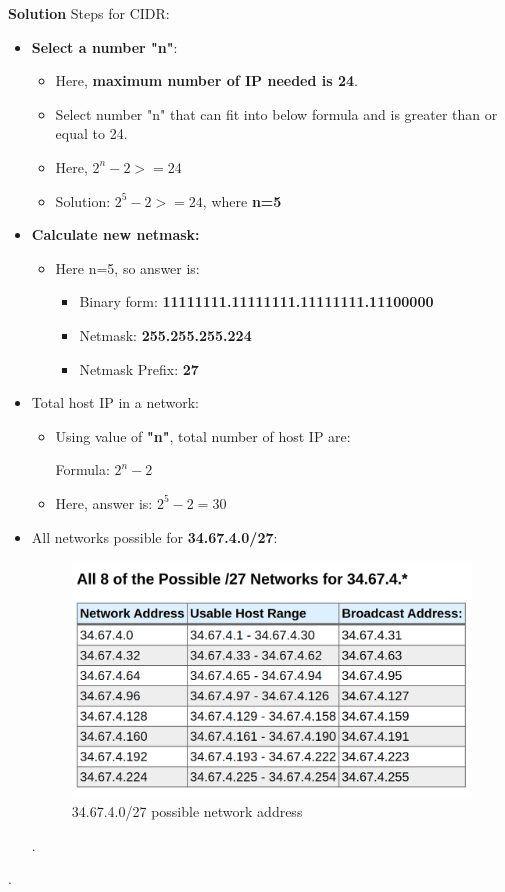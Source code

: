 \begin{flushleft}
\newpage
	\textbf{Solution}
\newline
Steps for CIDR:
\begin{itemize}
	
	\item \textbf{Select a number "n"}:
	\begin{itemize}
		\item Here, \textbf{maximum number of IP needed is 24}.
		\item Select number "n" that can fit into below formula and is greater than or equal to 24.
		\item Here, $2^n-2 >= 24$
		\item Solution: $2^5-2 >= 24$, where \textbf{n=5}
	\end{itemize}
	\item \textbf{Calculate new netmask:}
	\begin{itemize}
		\item Here n=5, so answer is:
		\begin{itemize}
			\item Binary form: \textbf{11111111.11111111.11111111.11100000}
			\item Netmask: \textbf{255.255.255.224}
			\item Netmask Prefix: \textbf{27}
		\end{itemize}
	\end{itemize}
	\item Total host IP in a network:
	\begin{itemize}
		\item Using value of \textbf{"n"}, total number of host IP are:
		\begin{tcolorbox}[breakable,notitle,boxrule=-0pt,colback=pink,colframe=pink]
			\color{black}
			Formula: $2^n-2$
			\font=4pt
		\end{tcolorbox}
		\item Here, answer is: $2^5-2=30$
	\end{itemize}
	\item All networks possible for \textbf{34.67.4.0/27}:
	\begin{figure}[h!]
		\centering
		\includegraphics[scale=.2]{content/chapter14/images/possible2.png}
		\caption{34.67.4.0/27 possible network address}
		\label{fig:cidr_new_2}
	\end{figure}	
	.
\end{itemize}
.
\newpage
\newpage	
	
\end{flushleft}
\newpage



